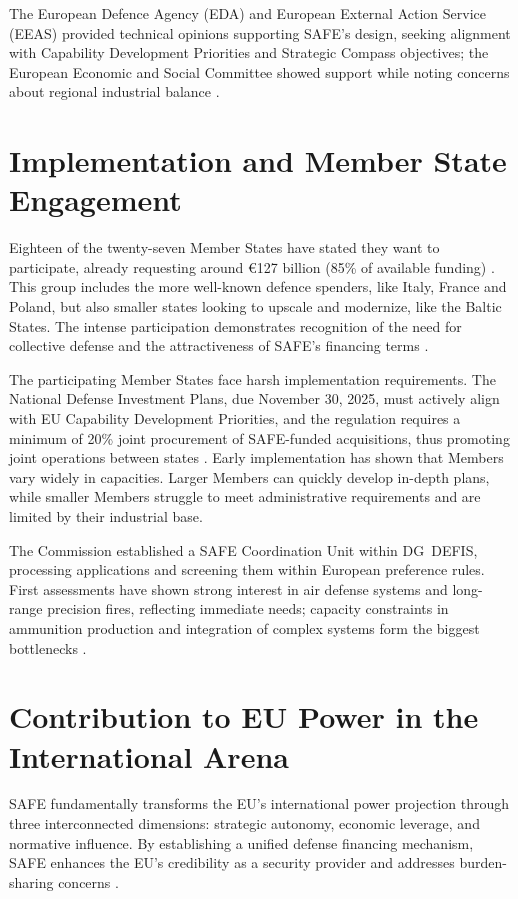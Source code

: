 \documentclass[12pt,a4paper]{article}
\begin{document}
\noindent The European Defence Agency (EDA) and European External Action Service (EEAS) provided technical opinions supporting SAFE's design, seeking alignment with Capability Development Priorities and Strategic Compass objectives; the European Economic and Social Committee showed support while noting concerns about regional industrial balance \parencite{commission2025safe}.

\section*{Implementation and Member State Engagement}
\noindent Eighteen of the twenty-seven Member States have stated they want to participate, already requesting around €127 billion (85\% of available funding) \parencite{commission2025update}. This group includes the more well-known defence spenders, like Italy, France and Poland, but also smaller states looking to upscale and modernize, like the Baltic States. The intense participation demonstrates recognition of the need for collective defense and the attractiveness of SAFE’s financing terms \parencite{commission2025update}.

\noindent The participating Member States face harsh implementation requirements. The National Defense Investment Plans, due November 30, 2025, must actively align with EU Capability Development Priorities, and the regulation requires a minimum of 20\% joint procurement of SAFE-funded acquisitions, thus promoting joint operations between states \parencite{eurlex2025}. Early implementation has shown that Members vary widely in capacities. Larger Members can quickly develop in-depth plans, while smaller Members struggle to meet administrative requirements and are limited by their industrial base.

\noindent The Commission established a SAFE Coordination Unit within DG~DEFIS, processing applications and screening them within European preference rules. First assessments have shown strong interest in air defense systems and long-range precision fires, reflecting immediate needs; capacity constraints in ammunition production and integration of complex systems form the biggest bottlenecks \parencite{commission2025safe}.

\section*{Contribution to EU Power in the International Arena}
\noindent SAFE fundamentally transforms the EU's international power projection through three interconnected dimensions: strategic autonomy, economic leverage, and normative influence. By establishing a unified defense financing mechanism, SAFE enhances the EU's credibility as a security provider and addresses burden-sharing concerns \parencite{verfassungsblog2025}.
\end{document}
